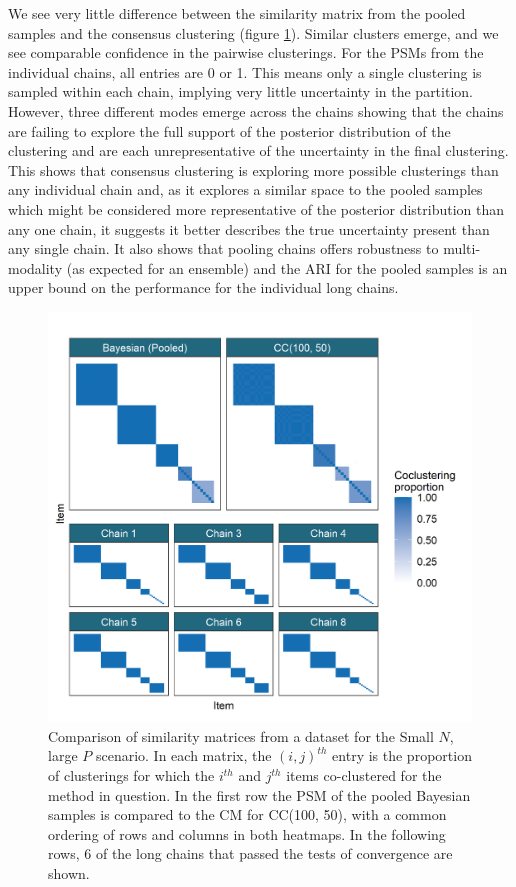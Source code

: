 \documentclass{bmcart}
\begin{document}
	We see very little difference between the similarity matrix from the pooled samples and the consensus clustering (figure \ref{fig:simSmallNLargePPSMs}). Similar clusters emerge, and we see comparable confidence in the pairwise clusterings. For the PSMs from the individual chains, all entries are 0 or 1. This means only a single clustering is sampled within each chain, implying very little uncertainty in the partition. However, three different modes emerge across the chains showing that the chains are failing to explore the full support of the posterior distribution of the clustering and are each unrepresentative of the uncertainty in the final clustering. This shows that consensus clustering is exploring more possible clusterings than any individual chain and, as it explores a similar space to the pooled samples which might be considered more representative of the posterior distribution than any one chain, it suggests it better describes the true uncertainty present than any single chain. It also shows that pooling chains offers robustness to multi-modality (as expected for an ensemble) and the ARI for the pooled samples is an upper bound on the performance for the individual long chains.
		
	\begin{figure} %
		\centering
		\includegraphics[scale=0.25]{./Images/Simulations/small_n_large_p_base/comp_psms_cm_edited.png}
		\caption{Comparison of similarity matrices from a dataset for the Small $N$, large $P$ scenario. In each matrix, the $(i, j)^{th}$ entry is the proportion of clusterings for which the $i^{th}$ and $j^{th}$ items co-clustered for the method in question. In the first row the PSM of the pooled Bayesian samples is compared to the CM for CC(100, 50), with a common ordering of rows and columns in both heatmaps. In the following rows, 6 of the long chains that passed the tests of convergence are shown.}
		\label{fig:simSmallNLargePPSMs}
	\end{figure}
	
\end{document}
